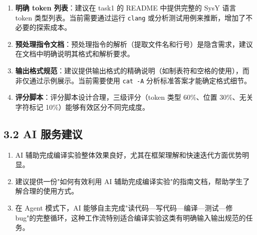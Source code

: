 \documentclass[12pt,a4paper]{article}
\begin{document}
\begin{enumerate}[leftmargin=2em]
    \item \textbf{明确 token 列表}：建议在 task1 的 README 中提供完整的 SysY 语言 token 类型列表。当前需要通过运行 \texttt{clang} 或分析测试用例来推断，增加了不必要的探索成本。
    \item \textbf{预处理指令文档}：预处理指令的解析（提取文件名和行号）是隐含需求，建议在文档中明确说明其格式和解析要求。
    \item \textbf{输出格式规范}：建议提供输出格式的精确说明（如制表符和空格的使用），而非仅通过示例展示。当前需要使用 \texttt{cat -A} 分析标准答案才能确定格式细节。
    \item \textbf{评分脚本}：评分脚本设计合理，三级评分（token 类型 60\%、位置 30\%、无关字符标记 10\%）能够有效区分不同完成度。
\end{enumerate}

\subsection{3.2 AI 服务建议}

\begin{enumerate}[leftmargin=2em]
    \item AI 辅助完成编译实验整体效果良好，尤其在框架理解和快速迭代方面优势明显。
    \item 建议提供一份"如何有效利用 AI 辅助完成编译实验"的指南文档，帮助学生了解合理的使用方式。
    \item 在 Agent 模式下，AI 能够自主完成"读代码—写代码—编译—测试—修 bug"的完整循环，这种工作流特别适合编译实验这类有明确输入输出规范的任务。
\end{enumerate}
\end{document}
